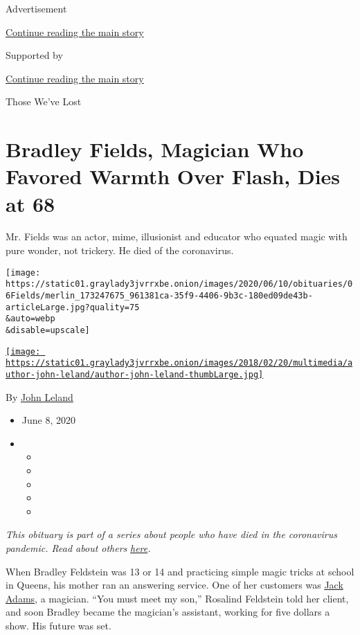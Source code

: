Advertisement

\protect\hyperlink{after-top}{Continue reading the main story}

Supported by

\protect\hyperlink{after-sponsor}{Continue reading the main story}

Those We've Lost

\hypertarget{bradley-fields-magician-who-favored-warmth-over-flash-dies-at-68}{%
\section{Bradley Fields, Magician Who Favored Warmth Over Flash, Dies at
68}\label{bradley-fields-magician-who-favored-warmth-over-flash-dies-at-68}}

Mr. Fields was an actor, mime, illusionist and educator who equated
magic with pure wonder, not trickery. He died of the coronavirus.

\texttt{[image: https://static01.graylady3jvrrxbe.onion/images/2020/06/10/obituaries/06Fields/merlin\_173247675\_961381ca-35f9-4406-9b3c-180ed09de43b-articleLarge.jpg?quality=75\\\&auto=webp\\\&disable=upscale]}

\href{https://www.nytimes3xbfgragh.onion/by/john-leland}{\texttt{[image: https://static01.graylady3jvrrxbe.onion/images/2018/02/20/multimedia/author-john-leland/author-john-leland-thumbLarge.jpg]}}

By \href{https://www.nytimes3xbfgragh.onion/by/john-leland}{John Leland}

\begin{itemize}
\item
  June 8, 2020
\item
  \begin{itemize}
  \item
  \item
  \item
  \item
  \item
  \end{itemize}
\end{itemize}

\emph{This obituary is part of a series about people who have died in
the coronavirus pandemic. Read about others}
\href{https://www.nytimes3xbfgragh.onion/interactive/2020/obituaries/people-died-coronavirus-obituaries.html}{\emph{here}}\emph{.}

When Bradley Feldstein was 13 or 14 and practicing simple magic tricks
at school in Queens, his mother ran an answering service. One of her
customers was
\href{https://www.magicana.com/news/blog/jack-adams-aka-merlin}{Jack
Adams}, a magician. ``You must meet my son,'' Rosalind Feldstein told
her client, and soon Bradley became the magician's assistant, working
for five dollars a show. His future was set.


